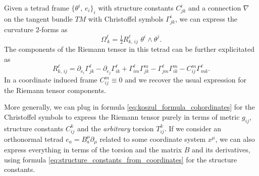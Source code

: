 \documentclass[../geometry_main.tex]{subfiles}
\begin{document}
\begin{mytheorem}
%
Given a tetrad frame \(\{\theta^i,\, e_i\}_i\) with structure constants \(C^i_{jk}\) and a connection $\nabla$ on the tangent bundle $TM$ with Christoffel symbols \(\Gamma^i_{jk}\), we can express the curvature 2-forms as
\begin{equation}
    \Omega^\ell_{\, k} = \tfrac{1}{2} R^\ell_{k,\,ij} \,\, \theta^i \wedge \theta^j.
\end{equation}
The components of the Riemann tensor in this tetrad can be further explicitated as
\begin{equation}
    R^\ell_{k,\,ij} = \partial_{e_i} \Gamma^\ell_{j k} - \partial_{e_j} \Gamma^\ell_{i k} + \Gamma^\ell_{i m} \Gamma^m_{j k} - \Gamma^\ell_{j m} \Gamma^m_{i k} - C^m_{ij} \Gamma^\ell_{m k}.
\end{equation}
In a coordinate induced frame $C_{ij}^m\equiv0$ and we recover the usual expression for the Riemann tensor components.

More generally, we can plug in formula \eqref{eq:koszul_formula_cohordinates} for the Christoffel symbols to express the Riemann tensor purely in terms of metric $g_{ij}$, structure constants $C_{ij}^k$ and the \emph{arbitrary} torsion $T_{ij}^k$.
%
If we consider an orthonormal tetrad $e_a = B_a^\mu \partial_\mu$ related to some coordinate system $x^\mu$, we can also express everything in terms of the torsion and the matrix $B$ and its derivatives, using formula \eqref{eq:structure_constants_from_coordinates} for the structure constants.
\end{mytheorem}
\end{document}
